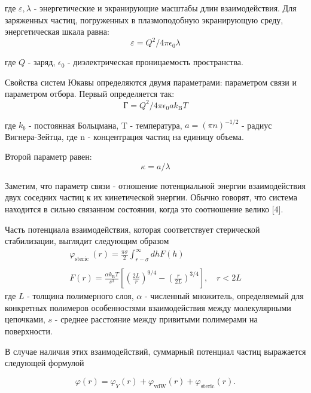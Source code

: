 где $\varepsilon, \lambda$ - энергетические и экранирующие масштабы длин взаимодействия. Для заряженных частиц, погруженных в плазмоподобную экранирующую среду, энергетическая шкала равна:
\begin{equation}
\varepsilon=Q^{2} / 4 \pi \epsilon_{0} \lambda
\end{equation}

где $Q$ - заряд, $\epsilon_{0}$ - диэлектрическая проницаемость пространства.

Свойства систем Юкавы определяются двумя параметрами: параметром связи и параметром отбора. Первый определяется так:
\begin{equation}
\text{Г}=Q^{2} / 4 \pi \epsilon_{0} a k_{\mathrm{B}} T
\end{equation}

где $k_b$ - постоянная Больцмана, T - температура, $a=(\pi n)^{-1 / 2}$ - радиус Вигнера-Зейтца, где n - концентрация частиц на единицу объема.

Второй параметр равен:
\begin{equation}\kappa=a / \lambda\end{equation}

Заметим, что параметр связи - отношение потенциальной энергии взаимодействия двух соседних частиц к их кинетической энергии. Обычно говорят, что система находится в сильно связанном состоянии, когда это соотношение велико [4].

Часть потенциала взаимодействия, которая соответствует стерической стабилизации, выглядит следующим образом \cite{Yur31}
\begin{equation}
\begin{array}{l}
\varphi_{\text {steric }}(r)=\frac{\pi \sigma}{2} \int_{r-\sigma}^{\infty} d h F(h) \\
\\
F(r)=\frac{\alpha k_{\mathrm{B}} T}{s^{3}}\left[\left(\frac{2 L}{r}\right)^{9 / 4}-\left(\frac{r}{2 L}\right)^{3 / 4}\right], \quad r<2 L
\end{array}
\label{eqStericStabl}
\end{equation}
где $L$ - толщина полимерного слоя, $\alpha$ - численный множитель, определяемый для конкретных полимеров
особенностями взаимодействия между молекулярными цепочками, $s$ - среднее расстояние между привитыми полимерами на поверхности.

В случае наличия этих взаимодействий, суммарный потенциал частиц выражается следующей формулой

\begin{equation}
\varphi(r)=\varphi_{Y}(r)+\varphi_{\mathrm{vdW}}(r)+\varphi_{\mathrm{steric}}(r).
\end{equation}

